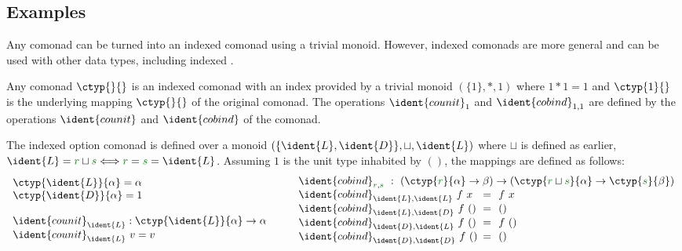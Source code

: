 \subsection{Examples}

Any comonad can be turned into an indexed comonad using a trivial monoid. However, indexed comonads
are more general and can be used with other data types, including indexed .

\begin{example}[Comonads]
Any comonad $\ctyp{}{}$ is an indexed comonad with an index provided by a trivial monoid $(\{1\},\ast,1)$
where $1\ast 1 = 1$ and $\ctyp{1}{}$ is the underlying mapping $\ctyp{}{}$ of the original comonad. The
operations $\ident{counit}_1$ and $\ident{cobind}_{1,1}$ are defined by the operations $\ident{counit}$
and $\ident{cobind}$ of the comonad.
\end{example}

\begin{example}
The indexed option comonad is defined over a monoid $(\{ \ident{L},\ident{D} \}, \sqcup,\ident{L})$ 
where $\sqcup$ is defined as earlier, \ie~$\ident{L} = \cclrd{r} \sqcup \cclrd{s} \Longleftrightarrow \cclrd{r}=\cclrd{s}=\ident{L}$.
Assuming $1$ is the unit type inhabited by $()$, the mappings are defined as follows:
\begin{equation*}
\begin{array}{l}
\ctyp{\ident{L}}{\alpha} = \alpha\\
\ctyp{\ident{D}}{\alpha} = 1\\
\\
\ident{counit}_{\ident{L}} : \ctyp{\ident{L}}{\alpha} \rightarrow \alpha \\
\ident{counit}_{\ident{L}}~v = v\\
\end{array}
\qquad
\begin{array}{lcl}
\multicolumn{3}{l}{
  \ident{cobind}_{\cclrd{r},\cclrd{s}} ~:~ (\ctyp{\cclrd{r}}{\alpha} \rightarrow \beta) 
    \rightarrow (\ctyp{\cclrd{r}\sqcup\cclrd{s}}{\alpha} \rightarrow \ctyp{\cclrd{s}}{\beta}) }\\
\ident{cobind}_{\ident{L},\ident{L}}~f~x &\narrow{=}& f~x\\
\ident{cobind}_{\ident{L},\ident{D}}~f~() &\narrow{=}& ()\\
\ident{cobind}_{\ident{D},\ident{L}}~f~() &\narrow{=}& f~()\\
\ident{cobind}_{\ident{D},\ident{D}}~f~() &\narrow{=}& ()\\
\end{array}
\end{equation*}
\end{example}

